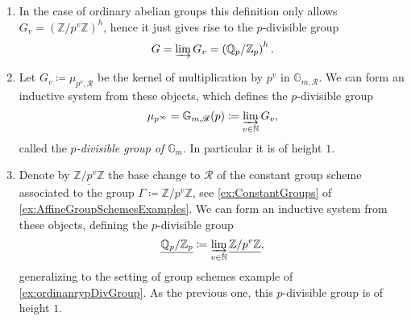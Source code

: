 \begin{ex}\leavevmode\vspace{-.2\baselineskip}\label{ex:pDivGroups}
\begin{enumerate}
\item In the case of ordinary abelian groups this definition\label{ex:ordinanrypDivGroup}
	only allows
	$G_v = \left( \mathbb{Z}/p^v\mathbb{Z} \right)^h$, hence
	it just gives rise to the $p$-divisible group
	\begin{equation*}
		G = \varinjlim G_v = \left( \mathbb{Q}_p / \mathbb{Z}_p \right)^h
	.\end{equation*} 

\item Let $G_v \coloneqq \mu_{p^v,\mathscr{R}}$ be the kernel of
	multiplication by $p^v$ in $\mathbb{G}_{m,\mathscr{R}}$.
	We can form an inductive system from these objects, which defines
	the $p$-divisible group
	\begin{equation*}
		\mu_{p^\infty} = \mathbb{G}_{ m, \mathscr{R} }(p) 
		\coloneqq \varinjlim_{v \in \mathbb{N}} G_v
	,\end{equation*}
	called the \emph{$p$-divisible group of $\mathbb{G}_m$}.
	In particular it is of height $1$.

\item Denote by $\underline{\mathbb{Z}/p^v\mathbb{Z}}$ the base change to $\mathscr{R}$\label{ex:Qp/Zp}
	of the constant group scheme associated
	to the group $\Gamma \coloneqq \mathbb{Z}/p^v\mathbb{Z}$, see 
	\cref{ex:ConstantGroups} of
	\cref{ex:AffineGroupSchemesExamples}.
	We can form an inductive system from these objects, defining the $p$-divisible group
	\begin{equation*}
	\underline{\mathbb{Q}_p/\mathbb{Z}_{p}} \coloneqq \varinjlim_{v \in \mathbb{N}}
	\underline{\mathbb{Z}/p^v\mathbb{Z}}
	,\end{equation*}
	generalizing to the setting of group schemes example of \cref{ex:ordinanrypDivGroup}.
	As the previous one, this $p$-divisible group is of height $1$.
	

\end{enumerate}
\end{ex}
